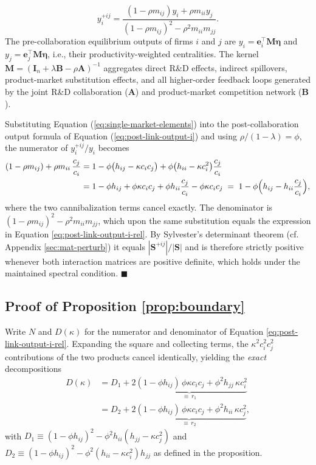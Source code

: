 \begin{equation}
y_{i}^{+ij} = \frac{(1-\rho m_{ij})y_{i} + \rho m_{ii}y_{j}}{(1-\rho m_{ij})^2-\rho^2 m_{ii}m_{jj}}.
\label{eq:post-link-output-i}
\end{equation}
The pre-collaboration equilibrium outputs of firms $i$ and $j$ are
$y_i = \mathbf{e}_i^\top \mathbf{M}\bm{\eta}$ and $y_j = \mathbf{e}_j^\top \mathbf{M}\bm{\eta}$, i.e., their productivity-weighted centralities. The kernel $\mathbf{M}=(\mathbf{I}_n+\lambda\mathbf{B}-\rho\mathbf{A})^{-1}$ aggregates direct R\&D effects, indirect spillovers, product-market substitution effects, and all higher-order feedback loops generated by the joint R\&D collaboration ($\mathbf{A}$) and product-market competition network ($\mathbf{B}$). 

Substituting Equation (\ref{eq:single-market-elements}) into the post-collaboration output formula of Equation (\ref{eq:post-link-output-i}) and using $\rho/(1-\lambda) = \phi$, the numerator of $y_i^{+ij}/y_i$ becomes
\begin{align*}
(1 - \rho m_{ij}) + \rho m_{ii}\,\frac{c_j}{c_i}
&= 1 - \phi\bigl( h_{ij} - \kappa c_i c_j \bigr) + \phi\bigl( h_{ii} - \kappa c_i^2 \bigr)\frac{c_j}{c_i} \\
&= 1 - \phi h_{ij} + \phi\kappa c_i c_j + \phi h_{ii}\frac{c_j}{c_i} - \phi\kappa c_i c_j
\;=\; 1 - \phi\Bigl( h_{ij} - h_{ii}\frac{c_j}{c_i} \Bigr),
\end{align*}
where the two cannibalization terms cancel exactly. The denominator is $(1-\rho m_{ij})^2 - \rho^2 m_{ii} m_{jj}$, which upon the same substitution equals the expression in Equation \eqref{eq:post-link-output-i-rel}. By Sylvester's determinant theorem (cf. Appendix \ref{sec:mat-perturb}) it equals $|\mathbf{S}^{+ij}|/|\mathbf{S}|$ and is therefore strictly positive whenever both interaction matrices are positive definite, which holds under the maintained spectral condition. \hfill$\blacksquare$

\subsection{Proof of Proposition \ref{prop:boundary}}
\label{app:proof-boundary}
Write $N$ and $D(\kappa)$ for the numerator and denominator of Equation \eqref{eq:post-link-output-i-rel}. Expanding the square and collecting terms, the $\kappa^2 c_i^2 c_j^2$ contributions of the two products cancel identically, yielding the \emph{exact} decompositions
\begin{align}
D(\kappa)
&= D_1 + \underbrace{2(1-\phi h_{ij})\,\phi\kappa c_i c_j + \phi^2 h_{jj}\,\kappa c_i^2}_{\displaystyle \equiv\, r_1}
\label{eq:app:D-decomp-1} \\
&= D_2 + \underbrace{2(1-\phi h_{ij})\,\phi\kappa c_i c_j + \phi^2 h_{ii}\,\kappa c_j^2}_{\displaystyle \equiv\, r_2},
\label{eq:app:D-decomp-2}
\end{align}
with $D_1 \equiv (1-\phi h_{ij})^2 - \phi^2 h_{ii}(h_{jj} - \kappa c_j^2)$ and $D_2 \equiv (1-\phi h_{ij})^2 - \phi^2 (h_{ii} - \kappa c_i^2) h_{jj}$ as defined in the proposition.

